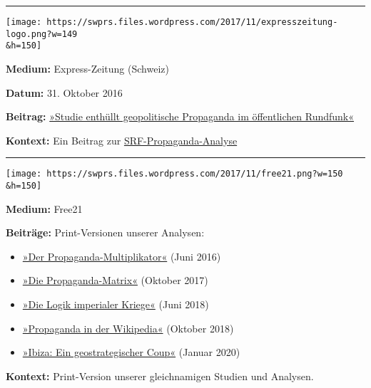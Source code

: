 \begin{center}\rule{0.5\linewidth}{\linethickness}\end{center}

\texttt{[image: https://swprs.files.wordpress.com/2017/11/expresszeitung-logo.png?w=149\\\&h=150]}

\textbf{Medium:} Express-Zeitung (Schweiz)

\textbf{Datum:} 31. Oktober 2016

\textbf{Beitrag:}
\href{https://web.archive.org/web/20170606031714/http://www.expresszeitung.com/gesellschaft/medien/602-studie-enthuellt-geopolitische-propaganda-im-oeffentlichen-rundfunk}{»Studie
enthüllt geopolitische Propaganda im öffentlichen Rundfunk«}

\textbf{Kontext:} Ein Beitrag zur
\href{https://swprs.org/srf-propaganda-analyse/}{SRF-Propaganda-Analyse}

\begin{center}\rule{0.5\linewidth}{\linethickness}\end{center}

\texttt{[image: https://swprs.files.wordpress.com/2017/11/free21.png?w=150\\\&h=150]}

\textbf{Medium:} Free21

\textbf{Beiträge:} Print-Versionen unserer Analysen:

\begin{itemize}
\tightlist
\item
  \href{http://www.free21.org/wp-content/uploads/2016/06/03-Propaganda-medien-schweiz_2.pdf}{»Der
  Propaganda-Multiplikator«} (Juni 2016)
\item
  \href{http://www.free21.org/wp-content/uploads/2017/09/03-SWPRS-Propagandamatrix-THQR.pdf}{»Die
  Propaganda-Matrix«} (Oktober 2017)
\item
  \href{http://www.free21.org/wp-content/uploads/2018/06/03-SWPRS-\%7F-Die-Logik-imperialer-Kriege-TH.pdf}{»Die
  Logik imperialer Kriege«} (Juni 2018)
\item
  \href{http://www.free21.org/wp-content/uploads/2018/09/03-SWPRS-Propaganda_in_der_Wikipedia-neu.pdf}{»Propaganda
  in der Wikipedia«} (Oktober 2018)
\item
  \href{http://www.free21.org/wp-content/uploads/2020/01/02-swprs-ibiza-ein-geostrategischer-coup.pdf}{»Ibiza:
  Ein geostrategischer Coup«} (Januar 2020)
\end{itemize}

\textbf{Kontext:} Print-Version unserer gleichnamigen Studien und
Analysen.

